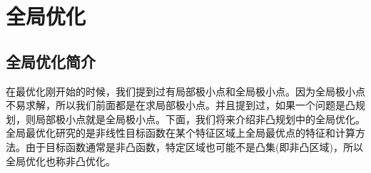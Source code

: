 % 
\chapter{全局优化}

\section{全局优化简介}
    \par
    在最优化刚开始的时候，我们提到过有局部极小点和全局极小点。因为全局极小点不易求解，所以我们前面都是在求局部极小点。并且提到过，如果一个问题是凸规划，则局部极小点就是全局极小点。下面，我们将来介绍非凸规划中的全局优化。全局最优化研究的是非线性目标函数在某个特征区域上全局最优点的特征和计算方法。由于目标函数通常是非凸函数，特定区域也可能不是凸集(即非凸区域)，所以全局优化也称非凸优化。
